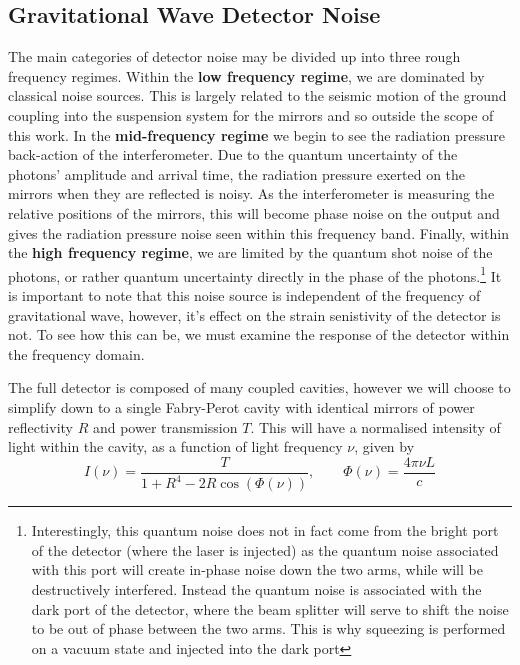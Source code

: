 \documentclass[aps,  
                a4paper, 
                amsmath, 
                amssymb, 
                preprint,
                tightenlines,  
                amsfonts,
                nofootinbib,
                onecolumn,
                titlepage,
                10pt
            ]{revtex4-2}
\begin{document}
    \subsection{Gravitational Wave Detector Noise}
    \label{sec:gwd-noise}
    The main categories of detector noise may be divided up into three rough frequency regimes. Within the \textbf{low frequency regime}, we are dominated by classical noise sources. This is largely related to the seismic motion of the ground coupling into the suspension system for the mirrors and so outside the scope of this work. In the \textbf{mid-frequency regime} we begin to see the radiation pressure back-action of the interferometer. Due to the quantum uncertainty of the photons' amplitude and arrival time, the radiation pressure exerted on the mirrors when they are reflected is noisy. As the interferometer is measuring the relative positions of the mirrors, this will become phase noise on the output and gives the radiation pressure noise seen within this frequency band. Finally, within the \textbf{high frequency regime}, we are limited by the quantum shot noise of the photons, or rather quantum uncertainty directly in the phase of the 
    photons.\footnote{Interestingly, this quantum noise does not in fact come from the bright port of the detector (where the laser is injected) as the quantum noise associated with this port will create in-phase noise down the two arms, while will be destructively interfered. Instead the quantum noise is associated with the dark port of the detector, where the beam splitter will serve to shift the noise to be out of phase between the two arms. This is why squeezing is performed on a vacuum state and injected into the dark port}
    It is important to note that this noise source is independent of the frequency of gravitational wave, however, it's effect on the strain senistivity of the detector is not. To see how this can be, we must examine the response of the detector within the frequency domain.
    \par
    The full detector is composed of many coupled cavities, however we will choose to simplify down to a single Fabry-Perot cavity with identical mirrors of power reflectivity $R$ and power transmission $T$. This will have a normalised intensity of light within the cavity, as a function of light frequency $\nu$, given by
    \begin{equation}
        \label{eq:fabry-perot-intracavity-intensity}
        I(\nu)=\frac{T}{1+R^4-2R\cos{(\Phi(\nu))}}, \qquad \Phi(\nu)=\frac{4\pi\nu L}{c}
    \end{equation}
\end{document}
